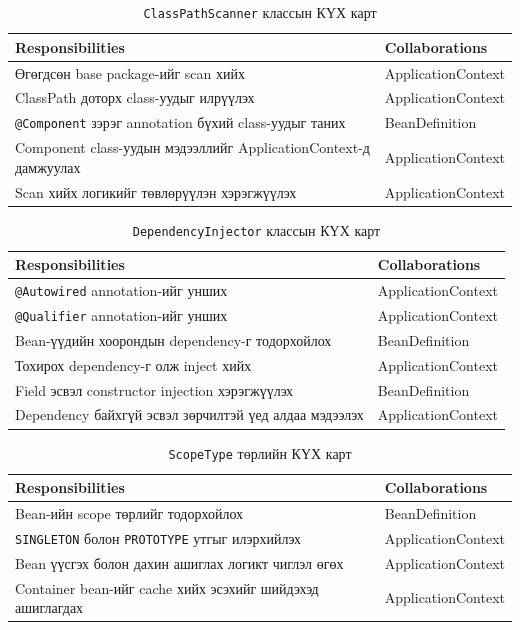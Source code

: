 \begin{table}[H]
\centering
\caption{\texttt{ClassPathScanner} классын КҮХ карт}
\label{tab:crc-classpathscanner}
\renewcommand{\arraystretch}{1.3}
\begin{tabular}{|p{7cm}|p{7cm}|}
\hline
\textbf{Responsibilities} & \textbf{Collaborations} \\ \hline
Өгөгдсөн base package-ийг scan хийх & ApplicationContext \\ \hline
ClassPath доторх class-уудыг илрүүлэх & ApplicationContext \\ \hline
\texttt{@Component} зэрэг annotation бүхий class-уудыг таних & BeanDefinition \\ \hline
Component class-уудын мэдээллийг ApplicationContext-д дамжуулах & ApplicationContext \\ \hline
Scan хийх логикийг төвлөрүүлэн хэрэгжүүлэх & ApplicationContext \\ \hline
\end{tabular}
\end{table}

\begin{table}[H]
\centering
\caption{\texttt{DependencyInjector} классын КҮХ карт}
\label{tab:crc-dependencyinjector}
\renewcommand{\arraystretch}{1.3}
\begin{tabular}{|p{7cm}|p{7cm}|}
\hline
\textbf{Responsibilities} & \textbf{Collaborations} \\ \hline
\texttt{@Autowired} annotation-ийг унших & ApplicationContext \\ \hline
\texttt{@Qualifier} annotation-ийг унших & ApplicationContext \\ \hline
Bean-үүдийн хоорондын dependency-г тодорхойлох & BeanDefinition \\ \hline
Тохирох dependency-г олж inject хийх & ApplicationContext \\ \hline
Field эсвэл constructor injection хэрэгжүүлэх & BeanDefinition \\ \hline
Dependency байхгүй эсвэл зөрчилтэй үед алдаа мэдээлэх & ApplicationContext \\ \hline
\end{tabular}
\end{table}

\begin{table}[H]
\centering
\caption{\texttt{ScopeType} төрлийн КҮХ карт}
\label{tab:crc-scopetype}
\renewcommand{\arraystretch}{1.3}
\begin{tabular}{|p{7cm}|p{7cm}|}
\hline
\textbf{Responsibilities} & \textbf{Collaborations} \\ \hline
Bean-ийн scope төрлийг тодорхойлох & BeanDefinition \\ \hline
\texttt{SINGLETON} болон \texttt{PROTOTYPE} утгыг илэрхийлэх & ApplicationContext \\ \hline
Bean үүсгэх болон дахин ашиглах логикт чиглэл өгөх & ApplicationContext \\ \hline
Container bean-ийг cache хийх эсэхийг шийдэхэд ашиглагдах & ApplicationContext \\ \hline
\end{tabular}
\end{table}


